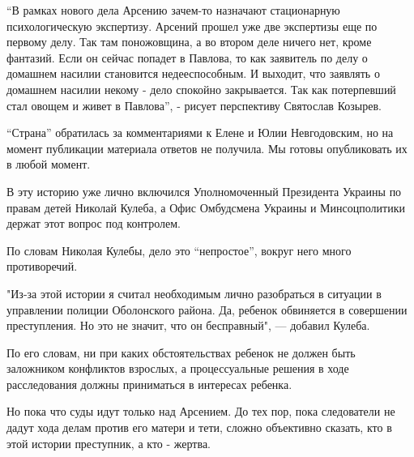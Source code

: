 “В рамках нового дела Арсению зачем-то назначают стационарную психологическую
экспертизу. Арсений прошел уже две экспертизы еще по первому делу. Так там
поножовщина, а во втором деле ничего нет, кроме фантазий. Если он сейчас
попадет в Павлова, то как заявитель по делу о домашнем насилии становится
недееспособным. И выходит, что заявлять о домашнем насилии некому - дело
спокойно закрывается. Так как потерпевший стал овощем и живет в Павлова”, -
рисует перспективу Святослав Козырев.

“Страна” обратилась за комментариями к Елене и Юлии Невгодовским, но на момент
публикации материала ответов не получила. Мы готовы опубликовать их в любой
момент.

В эту историю уже лично включился Уполномоченный Президента Украины по правам
детей Николай Кулеба, а Офис Омбудсмена Украины и Минсоцполитики держат этот
вопрос под контролем. 

По словам Николая Кулебы, дело это “непростое”, вокруг него много противоречий.

"Из-за этой истории я считал необходимым лично разобраться в ситуации в
управлении полиции Оболонского района. Да, ребенок обвиняется в совершении
преступления. Но это не значит, что он бесправный", — добавил Кулеба.

По его словам, ни при каких обстоятельствах ребенок не должен быть заложником
конфликтов взрослых, а процессуальные решения в ходе расследования должны
приниматься в интересах ребенка.

Но пока что суды идут только над Арсением. До тех пор, пока следователи не
дадут хода делам против его матери и тети, сложно объективно сказать, кто в
этой истории преступник, а кто - жертва. 
